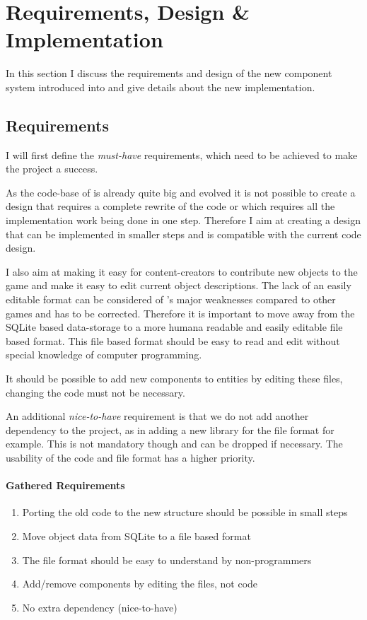 \section{Requirements, Design \& Implementation}
In this section I discuss the requirements and design of the new component system introduced into \UH{} and give details about the new
implementation.

\subsection{Requirements}
I will first define the \textit{must-have} requirements, which need to be achieved to make the project a success.

As the code-base of \UH{} is already quite big and evolved it is not possible to create a design that requires a
complete rewrite of the code or which requires all the implementation work being done in one step. Therefore I aim at
creating a design that can be implemented in smaller steps and is compatible with the current code design.

I also aim at making it easy for content-creators to contribute new objects to the game and make it easy to edit
current object descriptions. The lack of an easily editable format can be considered of \UH{}'s major weaknesses
compared to other \OS{} games and has to be corrected. Therefore it is important to move away from the SQLite based
data-storage to a more humana readable and easily editable file based format. This file based format should be easy to
read and edit without special knowledge of computer programming.

It should be possible to add new components to entities by editing these files, changing the code must not be necessary.

An additional \textit{nice-to-have} requirement is that we do not add another dependency to the project, as in adding a
new library for the file format for example. This is not mandatory though and can be dropped if necessary. The usability
of the code and file format has a higher priority.

\paragraph{Gathered Requirements}\label{requirements}

\begin{enumerate}
    \item Porting the old code to the new structure should be possible in small steps
    \item Move object data from SQLite to a file based format
    \item The file format should be easy to understand by non-programmers
    \item Add/remove components by editing the files, not code
    \item No extra dependency (nice-to-have)
\end{enumerate}

